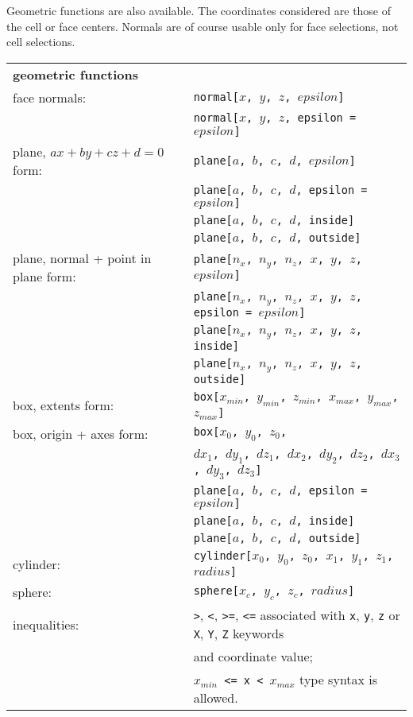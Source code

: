 {{{Geometric functions are also available. The coordinates considered are
those of the cell or face centers. Normals are of course
usable only for face selections, not cell selections.

\begin{tabular}[top]{p{6cm} l}
\multicolumn{2}{l}{\bf geometric functions }\\
face normals:   &  \texttt{normal[$x$, $y$, $z$, $epsilon$]} \\
                &  \texttt{normal[$x$, $y$, $z$, epsilon = $epsilon$]} \\
plane, $ax + by + cz + d = 0$ form: &  \texttt{plane[$a$, $b$, $c$, $d$, $epsilon$]} \\
                &  \texttt{plane[$a$, $b$, $c$, $d$, epsilon = $epsilon$]} \\
                &  \texttt{plane[$a$, $b$, $c$, $d$, inside]} \\
                &  \texttt{plane[$a$, $b$, $c$, $d$, outside]} \\
plane, normal + point in plane form: &  \texttt{plane[$n_x$, $n_y$, $n_z$, $x$, $y$, $z$, $epsilon$]} \\
                &  \texttt{plane[$n_x$, $n_y$, $n_z$, $x$, $y$, $z$, epsilon = $epsilon$]} \\
                &  \texttt{plane[$n_x$, $n_y$, $n_z$, $x$, $y$, $z$, inside]} \\
                &  \texttt{plane[$n_x$, $n_y$, $n_z$, $x$, $y$, $z$, outside]} \\
box, extents form: &  \texttt{box[$x_{min}$, $y_{min}$, $z_{min}$,
                                  $x_{max}$, $y_{max}$, $z_{max}$]} \\
box, origin + axes form: &  \texttt{box[$x_0$, $y_0$, $z_0$,}\\
                         &  \texttt{\qquad $dx_1$, $dy_1$, $dz_1$,
                                        $dx_2$, $dy_2$, $dz_2$,
                                        $dx_3$, $dy_3$, $dz_3$]} \\
                &  \texttt{plane[$a$, $b$, $c$, $d$, epsilon = $epsilon$]} \\
                &  \texttt{plane[$a$, $b$, $c$, $d$, inside]} \\
                &  \texttt{plane[$a$, $b$, $c$, $d$, outside]} \\
cylinder:       &  \texttt{cylinder[$x_0$, $y_0$, $z_0$, $x_1$, $y_1$, $z_1$, $radius$]} \\
sphere:         &  \texttt{sphere[$x_c$, $y_c$, $z_c$, $radius$]} \\
inequalities:   &  \texttt{>}, \texttt{<}, \texttt{>=}, \texttt{<=} associated
                   with \texttt{x}, \texttt{y}, \texttt{z}  or
                   \texttt{X}, \texttt{Y}, \texttt{Z} keywords\\
                &   and coordinate value; \\
                &  \texttt{$x_{min}$ <= x < $x_{max}$} type syntax is allowed. \\
\end{tabular}

}}}
